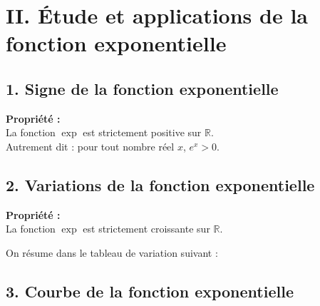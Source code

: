 \documentclass[11pt,a4paper]{article}
\begin{document}
\section*{II. Étude et applications de la fonction exponentielle}

\subsection*{1. Signe de la fonction exponentielle}

\begin{mdframed}[style=proprieteStyle]
    \textbf{Propriété :} ~\\
    La fonction $\exp$ est strictement positive sur $\mathbb{R}$. \\
    Autrement dit : pour tout nombre réel $x$, $e^x>0$.
\end{mdframed}

\subsection*{2. Variations de la fonction exponentielle}

\begin{mdframed}[style=proprieteStyle]
    \textbf{Propriété :} ~\\
    La fonction $\exp$ est strictement croissante sur $\mathbb{R}$.
\end{mdframed}

On résume dans le tableau de variation suivant : ~\\


\subsection*{3. Courbe de la fonction exponentielle}
\end{document}

